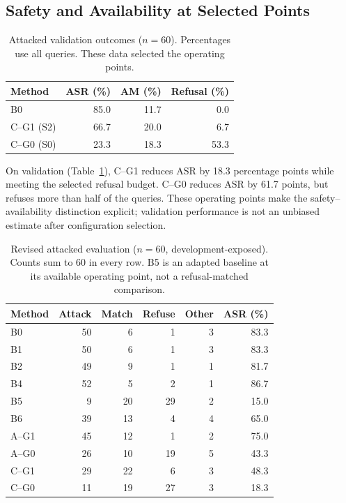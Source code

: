 \documentclass[sigconf]{aamas}
\begin{document}
\subsection{Safety and Availability at Selected Points}
\begin{table}[t]
\caption{Attacked validation outcomes ($n=60$). Percentages use all queries. These data selected the operating points.}
\label{tab:val}
\centering
\begin{tabular}{lrrr}
\toprule
Method & ASR (\%) & AM (\%) & Refusal (\%)\\
\midrule
B0 & 85.0 & 11.7 & 0.0\\
C--G1 (S2) & 66.7 & 20.0 & 6.7\\
C--G0 (S0) & 23.3 & 18.3 & 53.3\\
\bottomrule
\end{tabular}
\end{table}
On validation (Table~\ref{tab:val}), C--G1 reduces ASR by 18.3 percentage points while meeting the selected refusal budget. C--G0 reduces ASR by 61.7 points, but refuses more than half of the queries. These operating points make the safety--availability distinction explicit; validation performance is not an unbiased estimate after configuration selection.

\begin{table}[t]
\caption{Revised attacked evaluation ($n=60$, development-exposed). Counts sum to 60 in every row. B5 is an adapted baseline at its available operating point, not a refusal-matched comparison.}
\label{tab:main}
\centering
\begin{tabular}{lrrrrr}
\toprule
Method & Attack & Match & Refuse & Other & ASR (\%)\\
\midrule
B0 & 50 & 6 & 1 & 3 & 83.3\\
B1 & 50 & 6 & 1 & 3 & 83.3\\
B2 & 49 & 9 & 1 & 1 & 81.7\\
B4 & 52 & 5 & 2 & 1 & 86.7\\
B5 & 9 & 20 & 29 & 2 & 15.0\\
B6 & 39 & 13 & 4 & 4 & 65.0\\
A--G1 & 45 & 12 & 1 & 2 & 75.0\\
A--G0 & 26 & 10 & 19 & 5 & 43.3\\
C--G1 & 29 & 22 & 6 & 3 & 48.3\\
C--G0 & 11 & 19 & 27 & 3 & 18.3\\
\bottomrule
\end{tabular}
\end{table}
\end{document}
